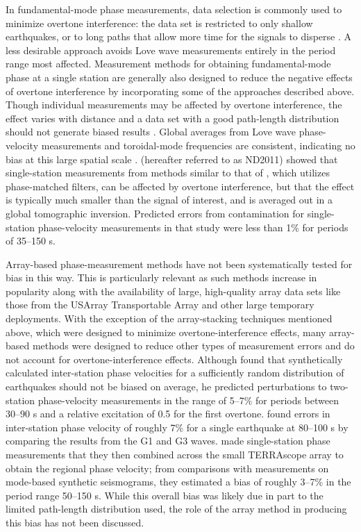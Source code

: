 \documentclass[12pt,oneside]{book}
\begin{document}
In fundamental-mode phase measurements, data selection is commonly used to minimize overtone interference: the data set is restricted to only shallow earthquakes, or to long paths that allow more time for the signals to disperse \citep{Knopoff1972}. A less desirable approach avoids Love wave measurements entirely in the period range most affected. Measurement methods for obtaining fundamental-mode phase at a single station are generally also designed to reduce the negative effects of overtone interference by incorporating some of the approaches described above. Though individual measurements may be affected by overtone interference, the effect varies with distance and a data set with a good path-length distribution should not generate biased results \citep{Boore1969}. Global averages from Love wave phase-velocity measurements and toroidal-mode frequencies are consistent, indicating no bias at this large spatial scale \citep{LaskeWidmer2007}.  \citet{Nettles2011} (hereafter referred to as ND2011) showed that single-station measurements from methods similar to that of \citet{Ekstrom1997}, which utilizes phase-matched filters, can be affected by overtone interference, but that the effect is typically much smaller than the signal of interest, and is averaged out in a global tomographic inversion. Predicted errors from contamination for single-station phase-velocity measurements in that study were less than 1\% for periods of 35--150 s.  

Array-based phase-measurement methods have not been systematically tested for bias in this way. This is particularly relevant as such methods increase in popularity along with the availability of large, high-quality array data sets like those from the USArray Transportable Array and other large temporary deployments. With the exception of the array-stacking techniques mentioned above, which were designed to minimize overtone-interference effects, many array-based methods were designed to reduce other types of measurement errors and do not account for overtone-interference effects. Although \citet{Boore1969} found that synthetically calculated inter-station phase velocities for a sufficiently random distribution of earthquakes should not be biased on average, he predicted perturbations to two-station phase-velocity measurements in the range of 5--7\% for periods between 30--90 s and a relative excitation of 0.5 for the first overtone. \citet{James1971} found errors in inter-station phase velocity of roughly 7\% for a single earthquake at 80--100 s by comparing the results from the G1 and G3 waves.  \citet{PoletKanamori1997} made single-station phase measurements that they then combined across the small TERRAscope array to obtain the regional phase velocity; from comparisons with measurements on mode-based synthetic seismograms, they estimated a bias of roughly 3--7\% in the period range 50--150 s. While this overall bias was likely due in part to the limited path-length distribution used, the role of the array method in producing this bias has not been discussed. 
\end{document}
